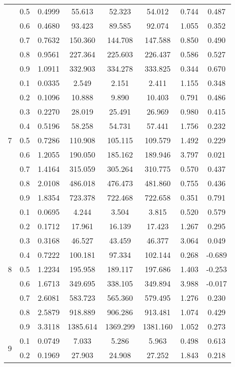 \documentclass[11pt,a4paper]{report}
\begin{document}
\begin{longtable}{ | c | c || c | c | c | c | c | c | }
 & 0.5 & 0.4999 & 55.613 & 52.323 & 54.012 & 0.744 & 0.487 \\
 & 0.6 & 0.4680 & 93.423 & 89.585 & 92.074 & 1.055 & 0.352 \\
 & 0.7 & 0.7632 & 150.360 & 144.708 & 147.588 & 0.850 & 0.490 \\
 & 0.8 & 0.9561 & 227.364 & 225.603 & 226.437 & 0.586 & 0.527 \\
 & 0.9 & 1.0911 & 332.903 & 334.278 & 333.825 & 0.344 & 0.670 \\
 \hline
\multirow{9}{*}{7} & 0.1 & 0.0335 & 2.549 & 2.151 & 2.411 & 1.155 & 0.348 \\
 & 0.2 & 0.1096 & 10.888 & 9.890 & 10.403 & 0.791 & 0.486 \\
 & 0.3 & 0.2270 & 28.019 & 25.491 & 26.969 & 0.980 & 0.415 \\
 & 0.4 & 0.5196 & 58.258 & 54.731 & 57.441 & 1.756 & 0.232 \\
 & 0.5 & 0.7286 & 110.908 & 105.115 & 109.579 & 1.492 & 0.229 \\
 & 0.6 & 1.2055 & 190.050 & 185.162 & 189.946 & 3.797 & 0.021 \\
 & 0.7 & 1.4164 & 315.059 & 305.264 & 310.775 & 0.570 & 0.437 \\
 & 0.8 & 2.0108 & 486.018 & 476.473 & 481.860 & 0.755 & 0.436 \\
 & 0.9 & 1.8354 & 723.378 & 722.468 & 722.658 & 0.351 & 0.791 \\
 \hline
\multirow{9}{*}{8} & 0.1 & 0.0695 & 4.244 & 3.504 & 3.815 & 0.520 & 0.579 \\
 & 0.2 & 0.1712 & 17.961 & 16.139 & 17.423 & 1.267 & 0.295 \\
 & 0.3 & 0.3168 & 46.527 & 43.459 & 46.377 & 3.064 & 0.049 \\
 & 0.4 & 0.7222 & 100.181 & 97.334 & 102.144 & 0.268 & -0.689 \\
 & 0.5 & 1.2234 & 195.958 & 189.117 & 197.686 & 1.403 & -0.253 \\
 & 0.6 & 1.6713 & 349.695 & 338.105 & 349.894 & 3.988 & -0.017 \\
 & 0.7 & 2.6081 & 583.723 & 565.360 & 579.495 & 1.276 & 0.230 \\
 & 0.8 & 2.5879 & 918.889 & 906.286 & 913.481 & 1.074 & 0.429 \\
 & 0.9 & 3.3118 & 1385.614 & 1369.299 & 1381.160 & 1.052 & 0.273 \\
 \hline
\multirow{9}{*}{9} & 0.1 & 0.0749 & 7.033 & 5.286 & 5.963 & 0.498 & 0.613 \\
 & 0.2 & 0.1969 & 27.903 & 24.908 & 27.252 & 1.843 & 0.218 \\

\end{longtable}
\end{document}
